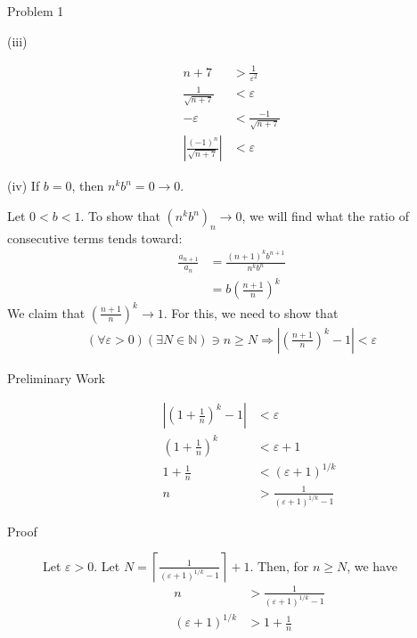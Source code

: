\documentclass[8pt]{extarticle}
\newcommand{\N}{\mathbb{N}}
\begin{document}
\begin{problem}{Problem 1}
\begin{problem}{(iii)}
\begin{description}
\begin{align*}
            n + 7 &> \frac{1}{\varepsilon^2}\\
            \frac{1}{\sqrt{n+7}} & < \varepsilon\\
            -\varepsilon &< \frac{-1}{\sqrt{n+7}}\\
            \left|\frac{(-1)^{n}}{\sqrt{n+7}}\right| & < \varepsilon
          \end{align*}
      \end{description}
    \end{problem}
    \begin{problem}{(iv)}
      If $b = 0$, then $n^kb^n = 0 \rightarrow 0$.\newline

      Let $0 < b < 1$. To show that $(n^kb^n)_n \rightarrow 0$, we will find what the ratio of consecutive terms tends toward:
      \begin{align*}
        \frac{a_{n+1}}{a_n} &= \frac{(n+1)^kb^{n+1}}{n^kb^n}\\
                            &= b\left(\frac{n+1}{n}\right)^k
      \end{align*}
      We claim that $\left(\frac{n+1}{n}\right)^k \rightarrow 1$. For this, we need to show that
      \begin{align*}
        (\forall \varepsilon > 0)(\exists N\in\N)\ni n\geq N \Rightarrow \left|\left(\frac{n+1}{n}\right)^k - 1 \right| < \varepsilon
      \end{align*}
      \begin{description}
        \item[Preliminary Work]
          \begin{align*}
            \left|\left(1 + \frac{1}{n}\right)^k - 1 \right| &< \varepsilon\\
            \left(1+\frac{1}{n}\right)^k &< \varepsilon + 1\\
            1 + \frac{1}{n} &< \left(\varepsilon + 1\right)^{1/k}\\
            n &> \frac{1}{\left(\varepsilon + 1\right)^{1/k} -1}
          \end{align*}
        \item[Proof] Let $\varepsilon > 0$. Let $\displaystyle N = \left\lceil \frac{1}{\left(\varepsilon + 1\right)^{1/k}-1}\right\rceil + 1$. Then, for $n\geq N$, we have
          \begin{align*}
            n &> \frac{1}{\left(\varepsilon + 1\right)^{1/k}-1}\\
            (\varepsilon + 1)^{1/k} &> 1 + \frac{1}{n}\\

\end{align*}
\end{description}
\end{problem}
\end{problem}
\end{document}
